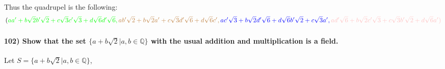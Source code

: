\documentclass[
]{article}
\begin{document}
Thus the quadrupel is the following: \[
(\color{green}{aa'} + \color{green}{b\sqrt{2}b'\sqrt{2}} + \color{green}{c \sqrt{3} c'\sqrt{3}} + \color{green}{d\sqrt{6} d' \sqrt{6}},\\
\color{brown}{ab'\sqrt{2}} + \color{brown}{b\sqrt{2}a'} + 
\color{brown}{c\sqrt{3}d'\sqrt{6}} + \color{brown}{d\sqrt{6} c'}, \\
\color{blue}{ac'\sqrt{3}} + \color{blue}{b\sqrt{2}d'\sqrt{6}} + \color{blue}{d\sqrt{6} b'\sqrt{2}} + \color{blue}{c\sqrt{3}a'}, \\
\color{pink}{ad'\sqrt{6}} + \color{pink}{b\sqrt{2}c'\sqrt{3}} + \color{pink}{c\sqrt{3}b'\sqrt{2}} + \color{pink}{d\sqrt{6}a'})
\]

\hypertarget{show-that-the-set-absqrt2ab-in-mathbbq-with-the-usual-addition-and-multiplication-is-a-field.}{%
\paragraph{\texorpdfstring{102) Show that the set
\(\{a+b\sqrt{2}|a,b \in \mathbb{Q}\}\) with the usual addition and
multiplication is a
field.}{102) Show that the set \textbackslash\{a+b\textbackslash sqrt\{2\}\textbar a,b \textbackslash in \textbackslash mathbb\{Q\}\textbackslash\} with the usual addition and multiplication is a field.}}\label{show-that-the-set-absqrt2ab-in-mathbbq-with-the-usual-addition-and-multiplication-is-a-field.}}

Let \(S = \{a+b\sqrt{2}|a,b \in \mathbb{Q}\}\),
\end{document}
